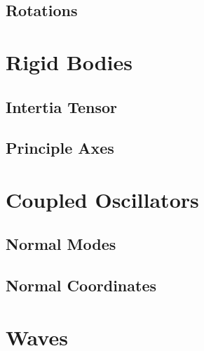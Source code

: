 \documentclass[main.tex]{subfiles}
\begin{document}
\section{Rotations}

\chapter{Rigid Bodies}

\section{Intertia Tensor}

\section{Principle Axes}

\chapter{Coupled Oscillators}

\section{Normal Modes}

\section{Normal Coordinates}

\chapter{Waves}
\end{document}
